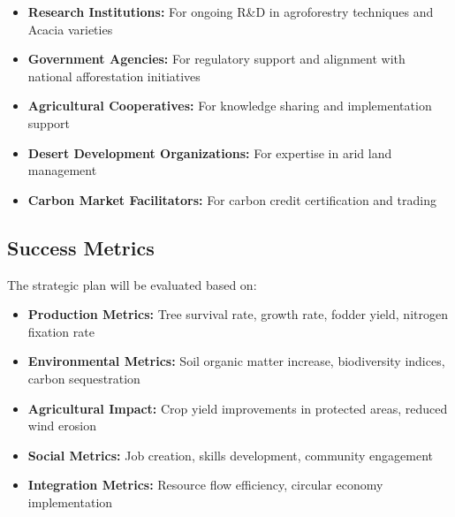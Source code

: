 \begin{itemize}
    \item \textbf{Research Institutions:} For ongoing R\&D in agroforestry techniques and Acacia varieties
    \item \textbf{Government Agencies:} For regulatory support and alignment with national afforestation initiatives
    \item \textbf{Agricultural Cooperatives:} For knowledge sharing and implementation support
    \item \textbf{Desert Development Organizations:} For expertise in arid land management
    \item \textbf{Carbon Market Facilitators:} For carbon credit certification and trading
\end{itemize}

\subsection{Success Metrics}

The strategic plan will be evaluated based on:

\begin{itemize}
    \item \textbf{Production Metrics:} Tree survival rate, growth rate, fodder yield, nitrogen fixation rate
    \item \textbf{Environmental Metrics:} Soil organic matter increase, biodiversity indices, carbon sequestration
    \item \textbf{Agricultural Impact:} Crop yield improvements in protected areas, reduced wind erosion
    \item \textbf{Social Metrics:} Job creation, skills development, community engagement
    \item \textbf{Integration Metrics:} Resource flow efficiency, circular economy implementation
\end{itemize}
